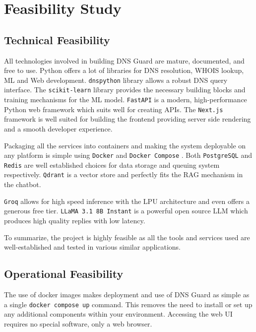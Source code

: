 \documentclass[12pt, a4paper, oneside]{report}
\begin{document}
\section{Feasibility Study}

\subsection{Technical Feasibility}

All technologies involved in building DNS Guard are mature, documented, and free to use. Python offers a lot of libraries for DNS resolution, WHOIS lookup, ML and Web development. \texttt{dnspython} library \cite{dnspython2024} allows a robust DNS query interface. The \texttt{scikit-learn} library \cite{pedregosa2011sklearn} provides the necessary building blocks and training mechanisms for the ML model. \texttt{FastAPI} \cite{fastapi2024} is a modern, high-performance Python web framework which suits well for creating APIs. The \texttt{Next.js} framework \cite{nextjs2024} is well suited for building the frontend providing server side rendering and a smooth developer experience.

Packaging all the services into containers and making the system deployable on any platform is simple using \texttt{Docker} and \texttt{Docker Compose} \cite{docker2024}. Both \texttt{PostgreSQL} \cite{postgresql2024} and \texttt{Redis} \cite{redis2024} are well established choices for data storage and queuing system respectively. \texttt{Qdrant} \cite{qdrant2024} is a vector store and perfectly fits the RAG mechanism in the chatbot.

\texttt{Groq} \cite{groq2024} allows for high speed inference with the LPU architecture and even offers a generous free tier. \texttt{LLaMA 3.1 8B Instant} is a powerful open source LLM which produces high quality replies with low latency.

To summarize, the project is highly feasible as all the tools and services used are well-established and tested in various similar applications.

\subsection{Operational Feasibility}

The use of docker images makes deployment and use of DNS Guard as simple as a single \texttt{docker compose up} command. This removes the need to install or set up any additional components within your environment. Accessing the web UI requires no special software, only a web browser.
\end{document}

